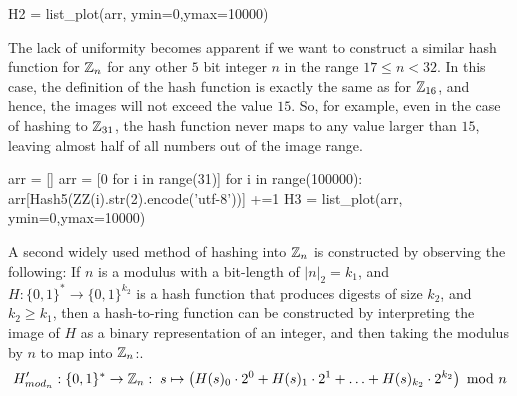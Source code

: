 \begin{example}
\begin{sagesilent}
H2 = list_plot(arr, ymin=0,ymax=10000)
\end{sagesilent}
\begin{center}
\end{center}
The lack of uniformity becomes apparent if we want to construct a similar hash function for $\mathbb{Z}_n$ for any other $5$ bit integer $n$ in the range $17\leq n < 32$. In this case, the definition of the hash function is exactly the same as for $\mathbb{Z}_{16}$, and hence, the images will not exceed the value $15$. So, for example, even in the case of hashing to $\mathbb{Z}_{31}$, the hash function never maps to any value larger than $15$, leaving almost half of all numbers out of the image range.
\begin{sagesilent}
arr = []
arr = [0 for i in range(31)]
for i in range(100000):
    arr[Hash5(ZZ(i).str(2).encode('utf-8'))] +=1
H3 = list_plot(arr, ymin=0,ymax=10000)
\end{sagesilent}
\begin{center}
\end{center}
\end{example}


A second widely used method of hashing into $\mathbb{Z}_n$ is constructed by observing the following: If $n$ is a modulus with a bit-length of $|n|_2=k_1$, and $H:\{0,1\}^*\to \{0,1\}^{k_2}$ is a hash function that produces digests of size $k_2$, and $k_2\geq k_1$, then a hash-to-ring function can be constructed by interpreting the image of $H$ as a binary representation of an integer, and then taking the modulus by $n$ to map into $\mathbb{Z}_n$:.
\begin{equation}
H'_{mod_n}: \{0,1\}^* \to \mathbb{Z}_n: \; s \mapsto
\left(H(s)_0\cdot 2^0 + H(s)_1\cdot 2^1 + \ldots + H(s)_{k_2}\cdot 2^{k_2}\right) \text{ mod } n
\end{equation}

